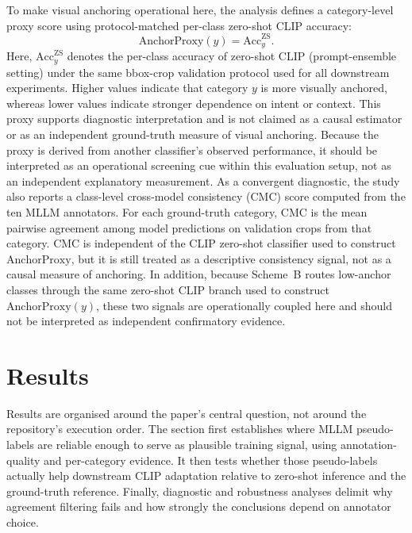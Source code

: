 \documentclass{ieeeaccess}
\begin{document}
To make visual anchoring operational here, the analysis
defines a category-level proxy score using protocol-matched per-class
zero-shot CLIP accuracy:
\[
\mathrm{AnchorProxy}(y)=\mathrm{Acc}^{\mathrm{ZS}}_{y}.
\]
Here, $\mathrm{Acc}^{\mathrm{ZS}}_{y}$ denotes the per-class accuracy of
zero-shot CLIP (prompt-ensemble setting) under the same bbox-crop
validation protocol used for all downstream experiments.
Higher values indicate that category $y$ is more visually anchored,
whereas lower values indicate stronger dependence on intent or context.
This proxy supports diagnostic interpretation and is not claimed as
a causal estimator or as an independent ground-truth measure of visual
anchoring.
Because the proxy is derived from another classifier's observed
performance, it should be interpreted as an operational screening cue
within this evaluation setup, not as an independent explanatory
measurement.
As a convergent diagnostic, the study also reports a class-level
cross-model consistency (CMC) score computed from the ten MLLM
annotators. For each ground-truth category, CMC is the mean pairwise
agreement among model predictions on validation crops from that
category. CMC is independent of the CLIP zero-shot classifier used to
construct $\mathrm{AnchorProxy}$, but it is still treated as a
descriptive consistency signal, not as a causal measure of
anchoring.
In addition, because Scheme~B routes low-anchor classes through the
same zero-shot CLIP branch used to construct
$\mathrm{AnchorProxy}(y)$, these two signals are operationally
coupled here and should not be interpreted as independent
confirmatory evidence.

\section{Results}
\label{sec:results}

Results are organised around the paper's central question, not around
the repository's execution order.
The section first establishes where MLLM pseudo-labels are reliable
enough to serve as plausible training signal, using annotation-quality
and per-category evidence.
It then tests whether those pseudo-labels actually help downstream
CLIP adaptation relative to zero-shot inference and the ground-truth
reference.
Finally, diagnostic and robustness analyses delimit why agreement
filtering fails and how strongly the conclusions depend on annotator
choice.
\end{document}
